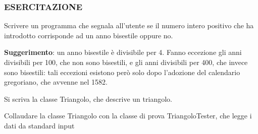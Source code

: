 \begin{frame}
\frametitle{ESERCITAZIONE}
\begin{block}{}
Scrivere un programma che segnala all'utente se il numero intero positivo che ha introdotto corrisponde ad un anno bisestile oppure no.
\end{block}
\begin{block}{}
\textbf{Suggerimento}: un anno bisestile è divisibile per 4. Fanno eccezione gli anni divisibili per 100, che non sono bisestili, e gli 
anni divisibili per 400, che invece sono bisestili: tali eccezioni esistono però solo dopo l'adozione del calendario gregoriano, che 
avvenne nel 1582.
\end{block}
\end{frame}

\begin{frame}[fragile]
\begin{block}{}
Si scriva la classe Triangolo, che descrive un triangolo. 
\end{block}
\begin{block}{}
Collaudare la classe Triangolo con la classe di prova TriangoloTester, che legge i dati da standard input
\end{block}
\end{frame}